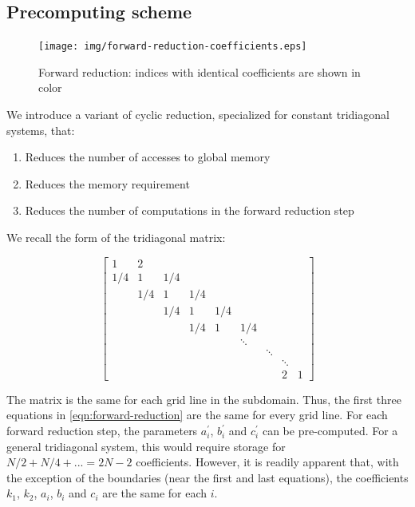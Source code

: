 \documentclass{article}
\begin{document}
    \subsection{Precomputing scheme}

        \begin{figure}[h]
        \begin{center}
        \texttt{[image: img/forward-reduction-coefficients.eps]}
        \end{center}
        \caption{Forward reduction: indices with identical coefficients are shown in color}
        \label{fig:forward-reduction-coefficients}
        \end{figure}

        We introduce a variant of cyclic reduction,
        specialized for constant tridiagonal systems, that:

        \begin{enumerate}
        \item Reduces the number of accesses to global memory
        \item Reduces the memory requirement
        \item Reduces the number of computations in the forward reduction step
        \end{enumerate}

        We recall the form of the tridiagonal matrix:

        \[
        \begin{bmatrix}
            1&2\\
            1/4&1&1/4\\
            &1/4&1&1/4\\
            &&1/4&1&1/4\\
            &&&1/4&1&1/4\\
            &&&&&\ddots\\
            &&&&&&\ddots\\
            &&&&&&&\ddots\\
            &&&&&&&2&1
         \end{bmatrix}
         \]

        The matrix is the same for each grid line in the subdomain.
        Thus,
        the first three equations in \ref{eqn:forward-reduction}
        are the same for every grid line.
        For each forward reduction step,
        the parameters $a^{\prime}_i$, $b^{\prime}_i$ and $c^{\prime}_i$
        can be pre-computed.
        For a general tridiagonal system, this would require storage for
        $N/2 + N/4 + ... = 2N-2$ coefficients.
        However, it is readily apparent that,
        with the exception of the boundaries (near the first and last equations),
        the coefficients $k_1$, $k_2$,
        $a_i$, $b_i$ and $c_i$ are the same for each $i$.
\end{document}
